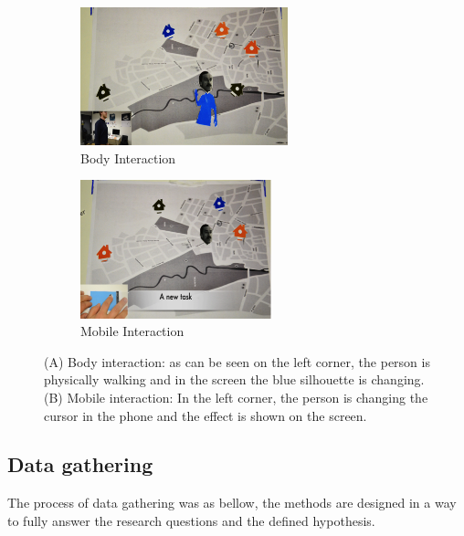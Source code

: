 \begin{figure}[H]
    \centering
    \begin{subfigure}[H]{0.45\textwidth}
        \centering
        \includegraphics[width=\textwidth,height=4cm]{Figures/5/body_interaction}
        \caption{Body Interaction}
        \label{fig:body_inter_}
    \end{subfigure}
    \hfill
    \begin{subfigure}[H]{0.45\textwidth}
        \centering
        \includegraphics[width=\textwidth,height=4cm]{Figures/5/mobile_interactions}
        \caption{Mobile Interaction}
        \label{fig:mobile_inter}
    \end{subfigure}
    \caption{(A) Body interaction: as can be seen on the left corner, the person is physically walking and in the screen the blue silhouette is changing.\\ (B) Mobile interaction: In the left corner, the person is changing the cursor in the phone and the effect is shown on the screen.}
    \label{fig:Interactive_prototype}
\end{figure}



\subsection{Data gathering}
The process of data gathering was as bellow, the methods are designed in a way to fully answer the research questions and the defined hypothesis.


